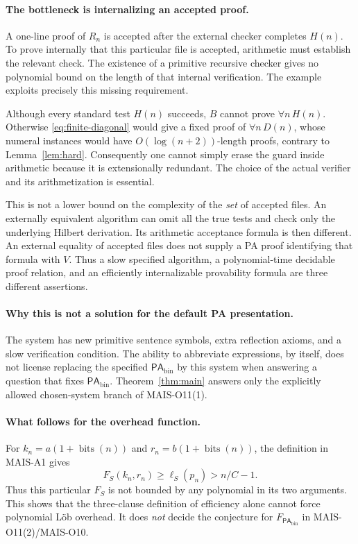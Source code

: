 \documentclass[11pt]{article}
\theoremstyle{remark}
\newcommand{\PAbin}{\mathsf{PA}_{\mathrm{bin}}}
\newcommand{\bits}{\operatorname{bits}}
\begin{document}
\paragraph{The bottleneck is internalizing an accepted proof.}
A one-line proof of $R_n$ is accepted after the external checker completes
$H(n)$. To prove internally that this particular file is accepted, arithmetic
must establish the relevant check. The existence of a primitive recursive
checker gives no polynomial bound on the length of that internal
verification. The example exploits precisely this missing requirement.

Although every standard test $H(n)$ succeeds, $B$ cannot prove
$\forall n\,H(n)$. Otherwise \eqref{eq:finite-diagonal} would give a fixed
proof of $\forall n\,D(n)$, whose numeral instances would have
$O(\log(n+2))$-length proofs, contrary to Lemma~\ref{lem:hard}.
Consequently one cannot simply erase the guard inside arithmetic because
it is extensionally redundant. The choice of the actual verifier and its
arithmetization is essential.

This is not a lower bound on the complexity of the \emph{set} of accepted
files. An externally equivalent algorithm can omit all the true tests and
check only the underlying Hilbert derivation. Its arithmetic acceptance
formula is then different. An external equality of accepted files does not
supply a PA proof identifying that formula with $V$. Thus a slow specified
algorithm, a polynomial-time decidable proof relation, and an efficiently
internalizable provability formula are three different assertions.

\paragraph{Why this is not a solution for the default PA presentation.}
The system has new primitive sentence symbols, extra reflection axioms, and
a slow verification condition. The ability to abbreviate expressions, by
itself, does not license replacing the specified $\PAbin$ by this system
when answering a question that fixes $\PAbin$. Theorem~\ref{thm:main}
answers only the explicitly allowed chosen-system branch of MAIS-O11(1).

\paragraph{What follows for the overhead function.}
For $k_n=a(1+\bits(n))$ and $r_n=b(1+\bits(n))$, the definition in
MAIS-A1 gives
\[
 F_S(k_n,r_n)\ge\ell_S(p_n)>n/C-1.
\]
Thus this particular $F_S$ is not bounded by any polynomial in its two
arguments. This shows that the three-clause definition of efficiency alone
cannot force polynomial L\"ob overhead. It does \emph{not} decide
the conjecture for $F_{\PAbin}$ in MAIS-O11(2)/MAIS-O10.
\end{document}
